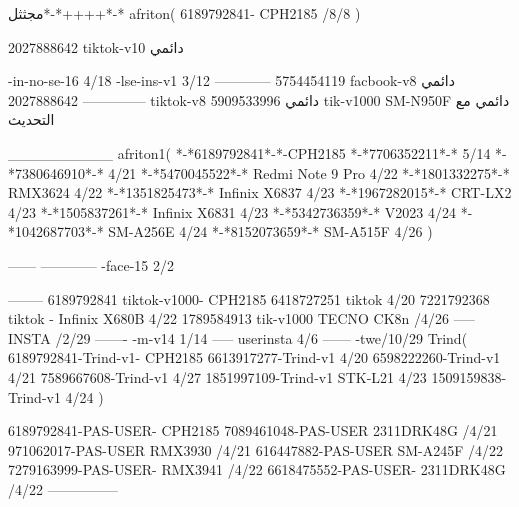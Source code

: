 مجثثل*-*++++*-*
afriton(
6189792841- CPH2185  /8/8
)

2027888642 tiktok-v10
دائمي

-in-no-se-16 4/18
-lse-ins-v1 3/12
------------
5754454119 facbook-v8
دائمي
--------------
2027888642 tiktok-v8
دائمي
5909533996 tik-v1000  SM-N950F
دائمي مع التحديث

__________
afriton1(
*-*6189792841*-*-CPH2185
*-*7706352211*-* 5/14
*-*7380646910*-* 4/21
*-*5470045522*-* Redmi Note 9 Pro 4/22
*-*1801332275*-* RMX3624 4/22
*-*1351825473*-* Infinix X6837 4/23
*-*1967282015*-* CRT-LX2 4/23
*-*1505837261*-* Infinix X6831 4/23
*-*5342736359*-* V2023 4/24
*-*1042687703*-* SM-A256E 4/24
*-*8152073659*-* SM-A515F 4/26
)


------
------------
-face-15 2/2

--------
6189792841 tiktok-v1000- CPH2185 
6418727251 tiktok 4/20
7221792368 tiktok - Infinix X680B  4/22 
1789584913 tik-v1000 TECNO CK8n /4/26
-----
 INSTA /2/29
-------
-m-v14 1/14
-----
userinsta 4/6
------
-twe/10/29
Trind(
6189792841-Trind-v1- CPH2185 
6613917277-Trind-v1  4/20
6598222260-Trind-v1  4/21
7589667608-Trind-v1  4/27
1851997109-Trind-v1 STK-L21 4/23
1509159838-Trind-v1  4/24
)

6189792841-PAS-USER- CPH2185 
7089461048-PAS-USER 2311DRK48G /4/21
971062017-PAS-USER RMX3930 /4/21
616447882-PAS-USER SM-A245F /4/22
7279163999-PAS-USER- RMX3941 /4/22
6618475552-PAS-USER- 2311DRK48G /4/22
    ---------------
